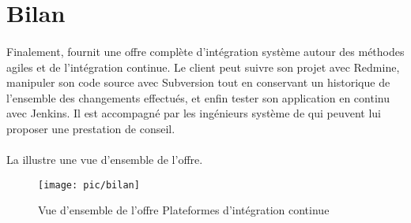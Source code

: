 \section{Bilan}

\paragraph{}
Finalement, \asmile{} fournit une offre complète d'intégration système autour des méthodes agiles et de l'intégration continue.
Le client peut suivre son projet avec Redmine, manipuler son code source avec Subversion tout en conservant un historique de l'ensemble des changements effectués, et enfin tester son application en continu avec Jenkins.
Il est accompagné par les ingénieurs système de \asmile{} qui peuvent lui proposer une prestation de conseil.

\paragraph{}
La  illustre une vue d'ensemble de l'offre.

\begin{figure}
	\centering
	\texttt{[image: pic/bilan]}
	\caption{Vue d'ensemble de l'offre \og Plateformes d'intégration continue \fg}
	\label{figure:pic:bilan}
\end{figure}

